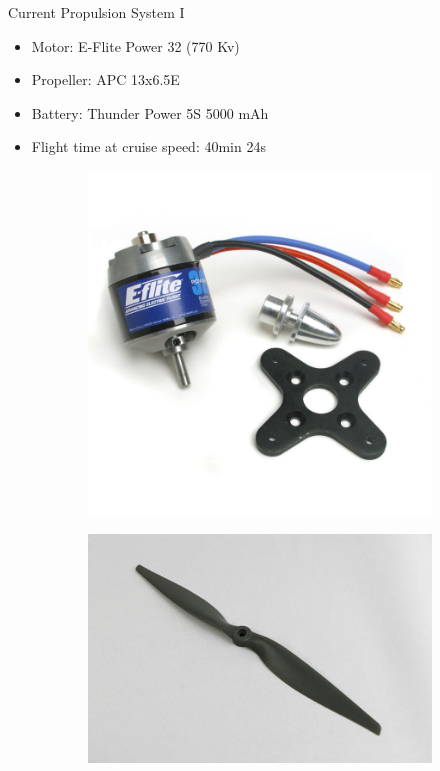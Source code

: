 \documentclass{beamer}
\begin{document}
    \begin{frame}{Current Propulsion System I}
        \begin{itemize}
            \item Motor: E-Flite Power 32 (770 Kv)
            \item Propeller: APC 13x6.5E
            \item Battery: Thunder Power 5S 5000 mAh
            \item Flight time at cruise speed: 40min 24s
        \end{itemize}

        \begin{figure}[htbp]
            \centering
            \begin{subfigure}{0.32\textwidth}
                \centering
                \includegraphics[width=\textwidth]{figures/eflite_motor.jpg}
            \end{subfigure}
            \hfill
            \begin{subfigure}{0.32\textwidth}
                \centering
                \includegraphics[width=\textwidth]{figures/apc_prop.jpg}

\end{subfigure}
\end{figure}
\end{frame}
\end{document}

